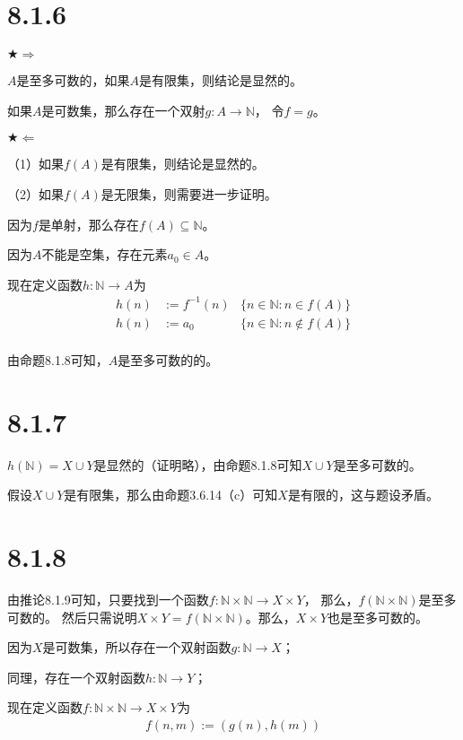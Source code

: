 \documentclass{article}
\theoremstyle{mystyle}
\begin{document}
\section*{8.1.6}

$\bigstar \Rightarrow$

$A$是至多可数的，如果$A$是有限集，则结论是显然的。

如果$A$是可数集，那么存在一个双射$g: A \rightarrow \mathbb{N}$，
令$f = g$。

$\bigstar \Leftarrow$

（1）如果$f(A)$是有限集，则结论是显然的。

（2）如果$f(A)$是无限集，则需要进一步证明。

因为$f$是单射，那么存在$f(A) \subseteq \mathbb{N}$。

因为$A$不能是空集，存在元素$a_0 \in A$。

现在定义函数$h: \mathbb{N} \rightarrow A$为
\begin{align*}
  h(n) & := f^{-1}(n) & \{n \in \mathbb{N}: n \in f(A) \}      \\
  h(n) & := a_0       & \{n \in \mathbb{N}: n \not \in f(A) \} \\
\end{align*}

由命题8.1.8可知，$A$是至多可数的的。
\section*{8.1.7}

$h(\mathbb{N}) = X \cup Y$是显然的（证明略），由命题8.1.8可知$X \cup Y$是至多可数的。

假设$X \cup Y$是有限集，那么由命题3.6.14（c）可知$X$是有限的，这与题设矛盾。

\section*{8.1.8}

由推论8.1.9可知，只要找到一个函数$f: \mathbb{N} \times \mathbb{N} \rightarrow X \times Y$，
那么，$f(\mathbb{N} \times \mathbb{N})$是至多可数的。
然后只需说明$X \times Y = f(\mathbb{N} \times \mathbb{N})$。那么，$X \times Y$也是至多可数的。

因为$X$是可数集，所以存在一个双射函数$g: \mathbb{N} \rightarrow X$；

同理，存在一个双射函数$h: \mathbb{N} \rightarrow Y$；

现在定义函数$f: \mathbb{N} \times \mathbb{N} \rightarrow X \times Y$为
\begin{align*}
  f(n,m) := (g(n), h(m))
\end{align*}
\end{document}
